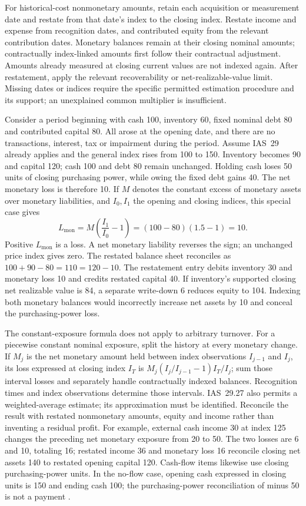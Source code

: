 For historical-cost nonmonetary amounts, retain each acquisition or measurement
date and restate from that date's index to the closing index. Restate income
and expense from recognition dates, and contributed equity from the relevant
contribution dates. Monetary balances remain at their closing nominal amounts;
contractually index-linked amounts first follow their contractual adjustment.
Amounts already measured at closing current values are not indexed again.
After restatement, apply the relevant recoverability or net-realizable-value
limit. Missing dates or indices require the specific permitted estimation
procedure and its support; an unexplained common multiplier is insufficient.

Consider a period beginning with cash 100, inventory 60, fixed nominal debt 80
and contributed capital 80. All arose at the opening date, and there are no
transactions, interest, tax or impairment during the period. Assume IAS~29
already applies and the general index rises from 100 to 150. Inventory becomes 90
and capital 120; cash 100 and debt 80 remain unchanged. Holding cash loses 50
units of closing purchasing power, while owing the fixed debt gains 40.
The net monetary loss is therefore 10. If \(M\) denotes the constant excess
of monetary assets over monetary liabilities, and \(I_0,I_1\) the opening
and closing indices, this special case gives
\[
 L_{\mathrm{mon}}=M\left(\frac{I_1}{I_0}-1\right)
 =(100-80)(1.5-1)=10.
\]
Positive \(L_{\mathrm{mon}}\) is a loss. A net monetary liability reverses
the sign; an unchanged price index gives zero. The restated balance sheet
reconciles as \(100+90-80=110=120-10\). The restatement entry debits
inventory 30 and monetary loss 10 and credits restated capital 40.
If inventory's supported closing net realizable value is 84, a separate
write-down 6 reduces equity to 104. Indexing both monetary balances would
incorrectly increase net assets by 10 and conceal the purchasing-power loss.

The constant-exposure formula does not apply to arbitrary turnover.
For a piecewise constant nominal exposure, split the history at every monetary
change. If \(M_j\) is the net monetary amount held between index observations
\(I_{j-1}\) and \(I_j\), its loss expressed at closing index \(I_T\) is
\(M_j(I_j/I_{j-1}-1)I_T/I_j\); sum those interval losses and separately
handle contractually indexed balances. Recognition times and index observations
determine those intervals. IAS~29.27 also permits a weighted-average estimate;
its approximation must be identified. Reconcile the result with restated
nonmonetary amounts, equity and income rather than inventing a residual profit.
For example, external cash income 30 at index 125 changes the preceding net
monetary exposure from 20 to 50. The two losses are 6 and 10, totaling 16;
restated income 36 and monetary loss 16 reconcile closing net assets 140 to
restated opening capital 120.
Cash-flow items likewise use closing purchasing-power units. In the no-flow
case, opening cash expressed in closing units is 150 and ending cash 100;
the purchasing-power reconciliation of minus 50 is not a payment
\citep[IAS~29.26--34]{eu20231803}.

